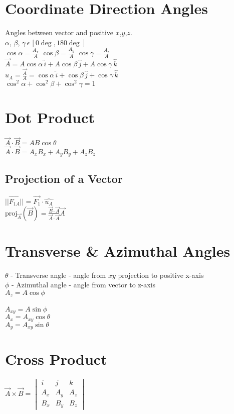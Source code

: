 \section*{Coordinate Direction Angles}

Angles between vector and positive $x$,$y$,$z$.\\
$\alpha$, $\beta$, $\gamma \,\epsilon \, [0\deg, 180\deg]$\\
$\cos\alpha = \frac{A_x}{A} \,\, \cos\beta = \frac{A_y}{A} \,\, \cos\gamma = \frac{A_z}{A}$\\
$\vec{A} = A\cos\alpha\, \hat{i} + A\cos\beta \, \hat{j} + A\cos\gamma \, \hat{k}$\\
$\hat{u}_A = \frac{\vec{A}}{A} = \cos\alpha \, \hat{i} + \cos\beta \, \hat{j} + \cos\gamma \, \hat{k}$\\
$\cos^2\alpha + \cos^2\beta + \cos^2\gamma = 1$\\

\section*{Dot Product}
$\vec{A} \cdot \vec{B} = AB\cos\theta$\\
$\vec{A}\cdot\vec{B} = A_xB_x + A_yB_y + A_zB_z$

\subsection*{Projection of a Vector}
$||\vec{F_{1A}}|| = \vec{F_1} \cdot \hat{u_A}$\\
$\text{proj}_{\vec{A}}(\vec{B}) = \frac{\vec{B}\cdot\vec{A}}{\vec{A}\cdot\vec{A}}\vec{A}$

\section*{Transverse \& Azimuthal Angles}
$\theta$ - Transverse angle - angle from $xy$ projection to positive x-axis\\
$\phi$ - Azimuthal angle - angle from vector to z-axis \\
$A_z = A\cos\phi$\\\\
$A_{xy} = A\sin\phi$\\
$A_x = A_{xy}\cos\theta$\\
$A_y = A_{xy}\sin\theta$\\
\section*{Cross Product}
$\vec{A} \times \vec{B} = \begin{vmatrix}
    i & j & k\\
    A_x & A_y & A_z \\
    B_x & B_y & B_z
\end{vmatrix}$



